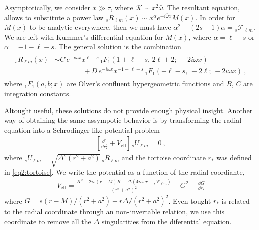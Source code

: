 Asymptotically, we consider $x\gg\tau$, where $\mathscr{K}\sim x^2 \bar{\omega}$. The resultant equation, 
allows to substitute a power law ${}_{s}R_{\ell m}(x)\sim x^\alpha e^{- i \bar{\omega} x} M(x)$. In order for $M(x)$ to be analytic everywhere, then we must have $\alpha^2+(2s+1)\alpha = {}_{s}\mathscr{F}_{\ell m}$. We are left with Kummer's differential equation for $M(x)$, where $\alpha = \ell-s$ or $\alpha=-1-\ell-s$. The general solution is the combination
\begin{align}
    \begin{split}
    {}_{s}R_{\ell m}(x) &\sim   C\,  e^{-i \bar{\omega} x} x^{\ell-s} \, {}_{1}F_1(1+\ell-s, \,2 \ell+2 ; \,-2 i \bar{\omega} x) \\
    &\qquad\qquad + D\,  e^{-i \bar{\omega} x} x^{-1-\ell-s} \, {}_{1}F_1(-\ell-s, \,-2 \ell; \,-2 i \bar{\omega} x) ~,
    \end{split}
    \label{eq3:RfarSolution}
\end{align}
where ${}_{1}F_1(a,b;x)$ are Olver's confluent hypergeometric functions and $B$, $C$ are integration constants.

Altought useful, these solutions do not provide enough physical insight. Another way of obtaining the same assympotic behavior is by transforming the radial equation into a Schrodinger-like potential problem
\begin{align}
    \label{eq3:D2PlusVeff}
    \left[ \frac{\dd^2}{\dd r_{*}^2} + V_\mathrm{eff} \right] {}_{s}U_{\ell m} = 0 ~,
\end{align}
where ${}_{s}U_{\ell m}=\sqrt{\Delta^s (r^2 + a^2)} \,{}_{s}R_{\ell m}$ and the tortoise coordinate $r_*$ was defined in \eqref{eq2:tortoise}.
We write the potential as a function of the radial coordiante,
\begin{align}
    V_\mathrm{eff} = \frac{K^2 - 2 i s (r-M) K + \Delta ( 4 i s \omega r - {}_{s}\mathscr{F}_{\ell m} )}{(r^2+a^2)^2} - G^2 - \frac{\dd G}{\dd r_{*}}
\end{align}
where $G = s(r-M)/(r^2+a^2)+ r \Delta/(r^2+a^2)^2$.
Even tought $r_*$ is related to the radial coordinate through an non-invertable relation, we use this coordinate to remove all the $\Delta$ singularities from the diferential equation. 


